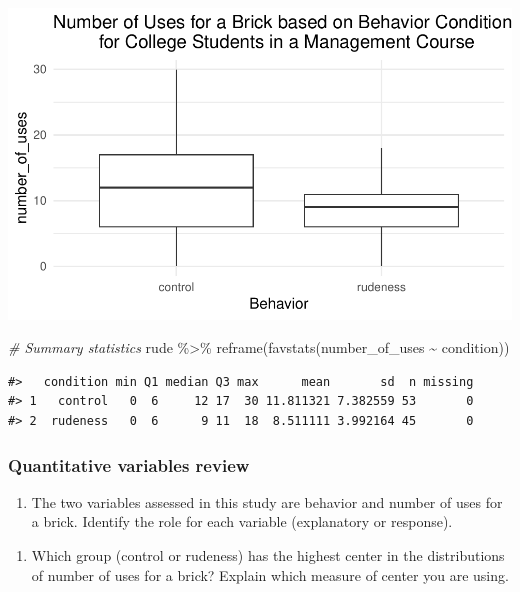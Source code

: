 \documentclass[
]{report}
\newenvironment{Shaded}{\begin{snugshade}}{\end{snugshade}}
\newcommand{\CommentTok}[1]{\textcolor[rgb]{0.56,0.35,0.01}{\textit{#1}}}
\newcommand{\FunctionTok}[1]{\textcolor[rgb]{0.00,0.00,0.00}{#1}}
\newcommand{\NormalTok}[1]{#1}
\newcommand{\SpecialCharTok}[1]{\textcolor[rgb]{0.00,0.00,0.00}{#1}}
\providecommand{\tightlist}{%
  \setlength{\itemsep}{0pt}\setlength{\parskip}{0pt}}
\begin{document}
\begin{center}\includegraphics[width=0.6\linewidth]{12-OCA09-inference-1ofeach-simulation_files/figure-latex/unnamed-chunk-2-1} \end{center}

\begin{Shaded}
\begin{Highlighting}[]
\CommentTok{\# Summary statistics}
\NormalTok{rude }\SpecialCharTok{\%\textgreater{}\%} 
     \FunctionTok{reframe}\NormalTok{(}\FunctionTok{favstats}\NormalTok{(number\_of\_uses }\SpecialCharTok{\textasciitilde{}}\NormalTok{ condition))}
\end{Highlighting}
\end{Shaded}

\begin{verbatim}
#>   condition min Q1 median Q3 max      mean       sd  n missing
#> 1   control   0  6     12 17  30 11.811321 7.382559 53       0
#> 2  rudeness   0  6      9 11  18  8.511111 3.992164 45       0
\end{verbatim}

\hypertarget{quantitative-variables-review}{%
\subsubsection*{Quantitative variables review}\label{quantitative-variables-review}}

\begin{enumerate}
\def\labelenumi{\arabic{enumi}.}
\tightlist
\item
  The two variables assessed in this study are behavior and number of uses for a brick. Identify the role for each variable (explanatory or response).
\end{enumerate}

\vspace{.4in}

\begin{enumerate}
\def\labelenumi{\arabic{enumi}.}
\setcounter{enumi}{1}
\tightlist
\item
  Which group (control or rudeness) has the highest center in the distributions of number of uses for a brick? Explain which measure of center you are using.
\end{enumerate}
\end{document}
